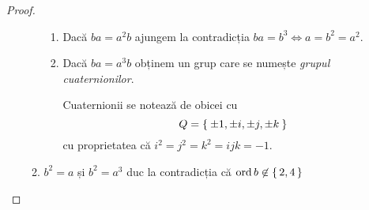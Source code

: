 \begin{proof}
\begin{enumerate}
\begin{enumerate}
\begin{enumerate}
            \item Dacă \(ba = a^2 b\) ajungem la contradicția \(ba = b^3 \iff a = b^2 = a^2\).

            \item Dacă \(ba = a^3 b\) obținem un grup care se numește \emph{grupul cuaternionilor}.

            Cuaternionii se notează de obicei cu
            \[
                Q = \Set{ \pm 1, \pm i, \pm j, \pm k }
            \]
            cu proprietatea că \(i^2 = j^2 = k^2 = ijk = -1\).
        \end{enumerate}

        \item \(b^2 = a\) și \(b^2 = a^3\) duc la contradicția că \(\operatorname{ord} b \not\in \set{2, 4}\)
    \end{enumerate}
\end{enumerate}
\end{proof}
